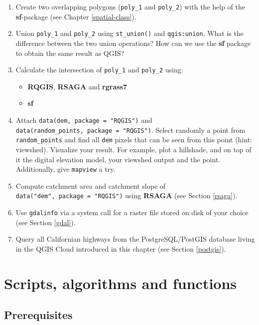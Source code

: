 \documentclass[]{krantz}
\providecommand{\tightlist}{%
  \setlength{\itemsep}{0pt}\setlength{\parskip}{0pt}}
\begin{document}
\begin{enumerate}
\def\labelenumi{\arabic{enumi}.}
\item
  Create two overlapping polygons (\texttt{poly\_1} and \texttt{poly\_2}) with the help of the \textbf{sf}-package (see Chapter \ref{spatial-class}).
\item
  Union \texttt{poly\_1} and \texttt{poly\_2} using \texttt{st\_union()} and \texttt{qgis:union}.
  What is the difference between the two union operations?
  How can we use the \textbf{sf} package to obtain the same result as QGIS?
\item
  Calculate the intersection of \texttt{poly\_1} and \texttt{poly\_2} using:

  \begin{itemize}
  \tightlist
  \item
    \textbf{RQGIS}, \textbf{RSAGA} and \textbf{rgrass7}
  \item
    \textbf{sf}
  \end{itemize}
\item
  Attach \texttt{data(dem,\ package\ =\ "RQGIS")} and \texttt{data(random\_points,\ package\ =\ "RQGIS")}.
  Select randomly a point from \texttt{random\_points} and find all \texttt{dem} pixels that can be seen from this point (hint: viewshed).
  Visualize your result.
  For example, plot a hillshade, and on top of it the digital elevation model, your viewshed output and the point.
  Additionally, give \texttt{mapview} a try.
\item
  Compute catchment area and catchment slope of \texttt{data("dem",\ package\ =\ "RQGIS")} using \textbf{RSAGA} (see Section \ref{rsaga}).
\item
  Use \texttt{gdalinfo} via a system call for a raster file stored on disk of your choice (see Section \ref{gdal}).
\item
  Query all Californian highways from the PostgreSQL/PostGIS database living in the QGIS Cloud introduced in this chapter (see Section \ref{postgis}).
\end{enumerate}

\hypertarget{algorithms}{%
\section{Scripts, algorithms and functions}\label{algorithms}}

\hypertarget{prerequisites-8}{%
\subsection*{Prerequisites}\label{prerequisites-8}}
\end{document}

